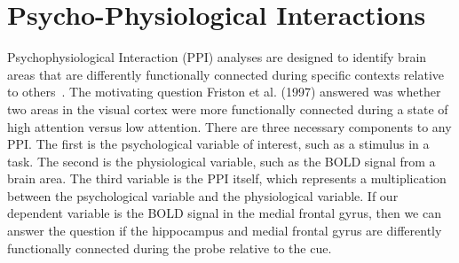 \documentclass[phd,appendix,figures]{uithesis}
\begin{document}
\section{Psycho-Physiological Interactions}

Psychophysiological Interaction (PPI) analyses are designed to 
identify brain areas that are differently functionally connected
during specific contexts relative to others~\cite{Friston1997}.
The motivating question Friston et al. (1997) answered was whether
two areas in the visual cortex were more functionally connected during a state
of high attention versus low attention.
There are three necessary components to any PPI.
The first is the psychological variable of interest, such as a stimulus
in a task.
The second is the physiological variable, such as the BOLD signal from
a brain area.
The third variable is the PPI itself, which represents a multiplication
between the psychological variable and the physiological variable.
If our dependent variable is the BOLD signal in the medial frontal gyrus,
then we can answer the question if the hippocampus and medial frontal gyrus
are differently functionally connected during the probe relative to the
cue.
\end{document}

